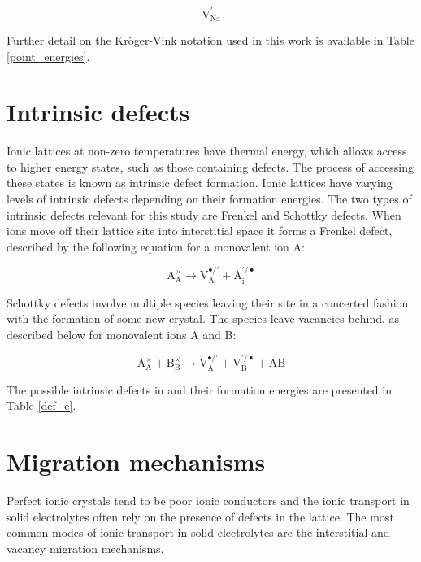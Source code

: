 \documentclass[12pt]{report}
\begin{document}
\begin{equation}
    \mathrm{V_{Na}^{\prime}}
\end{equation}

\noindent
Further detail on the Kr\"oger-Vink notation used in this work is available in Table \ref{point_energies}.

\section{Intrinsic defects}

Ionic lattices at non-zero temperatures have thermal energy, which allows access to higher energy states, such as those containing defects.
The process of accessing these states is known as intrinsic defect formation.
Ionic lattices have varying levels of intrinsic defects depending on their formation energies.
The two types of intrinsic defects relevant for this study are Frenkel and Schottky defects.
When ions move off their lattice site into interstitial space it forms a Frenkel defect, described by the following equation for a monovalent ion A:

\begin{equation}
    \mathrm{A_A^{\times} \rightarrow V_A^{\bullet/\prime} + A_i^{\prime/\bullet}}
\end{equation}

\noindent
Schottky defects involve multiple species leaving their site in a concerted fashion with the formation of some new crystal.
The species leave vacancies behind, as described below for monovalent ions A and B:

\begin{equation}
    \mathrm{A_A^{\times} + B_B^{\times} \rightarrow V_A^{\bullet/\prime} + V_B^{\prime/\bullet} + AB}
\end{equation}

\noindent
The possible intrinsic defects in  and their formation energies are presented in Table \ref{def_e}.

\section{Migration mechanisms}

Perfect ionic crystals tend to be poor ionic conductors and the ionic transport in solid electrolytes often rely on the presence of defects in the lattice.
The most common modes of ionic transport in solid electrolytes are the interstitial and vacancy migration mechanisms.\cite{mehrer2007} 
\end{document}
